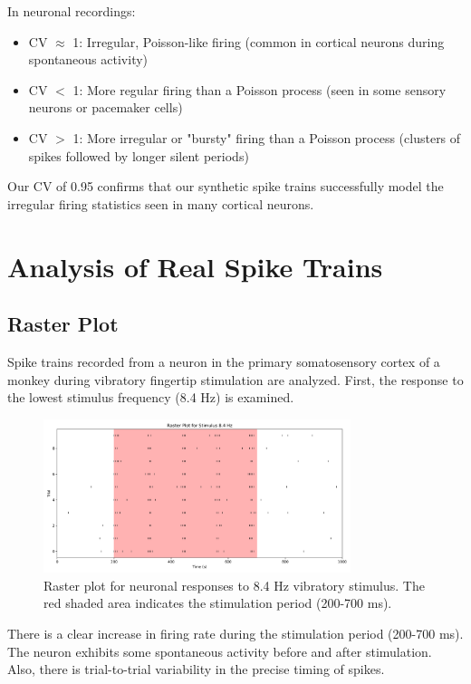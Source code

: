 \documentclass{article}
\begin{document}
In neuronal recordings:
\begin{itemize}
    \item CV $\approx$ 1: Irregular, Poisson-like firing (common in cortical neurons during spontaneous activity)
    \item CV $<$ 1: More regular firing than a Poisson process (seen in some sensory neurons or pacemaker cells)
    \item CV $>$ 1: More irregular or "bursty" firing than a Poisson process (clusters of spikes followed by longer silent periods)
\end{itemize}

Our CV of 0.95 confirms that our synthetic spike trains successfully model the irregular firing statistics seen in many cortical neurons.

\section{Analysis of Real Spike Trains}

\subsection{Raster Plot}

Spike trains recorded from a neuron in the primary somatosensory cortex of a monkey during vibratory fingertip stimulation are analyzed. First, the response to the lowest stimulus frequency (8.4 Hz) is examined.

\begin{figure}[H]
\centering
\includegraphics[width=0.8\textwidth]{Fig4_8.4Hz.png}
\caption{Raster plot for neuronal responses to 8.4 Hz vibratory stimulus. The red shaded area indicates the stimulation period (200-700 ms).}
\label{fig:real_raster}
\end{figure}

There is a clear increase in firing rate during the stimulation period (200-700 ms). The neuron exhibits some spontaneous activity before and after stimulation.
Also, there is trial-to-trial variability in the precise timing of spikes. 
\end{document}
